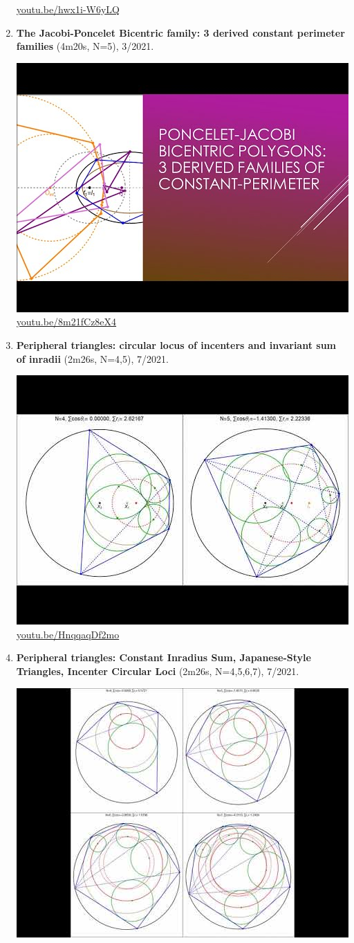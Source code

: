 \documentclass[12pt]{amsart}
\begin{document}
\begin{enumerate}[resume]
\begin{center}
\href{https://youtu.be/hwx1i-W6yLQ}{\url{youtu.be/hwx1i-W6yLQ}}\end{center}
% 
\item \textbf{The Jacobi-Poncelet Bicentric family: 3 derived constant perimeter families} (4m20s, N=5), 3/2021. 
\begin{center}\includegraphics[width=.5\textwidth]{pics/8m21fCz8eX4.jpg} \\ 
\href{https://youtu.be/8m21fCz8eX4}{\url{youtu.be/8m21fCz8eX4}}\end{center}
% 
\item \textbf{Peripheral triangles: circular locus of incenters and invariant sum of inradii} (2m26s, N=4,5), 7/2021. 
\begin{center}\includegraphics[width=.5\textwidth]{pics/HnqqaqDf2mo.jpg} \\ 
\href{https://youtu.be/HnqqaqDf2mo}{\url{youtu.be/HnqqaqDf2mo}}\end{center}
% 
\item \textbf{Peripheral triangles: Constant Inradius Sum, Japanese-Style Triangles, Incenter Circular Loci} (2m26s, N=4,5,6,7), 7/2021. 
\begin{center}\includegraphics[width=.5\textwidth]{pics/TGwlfBUtKrs.jpg} \\ 

\end{center}
\end{enumerate}
\end{document}
